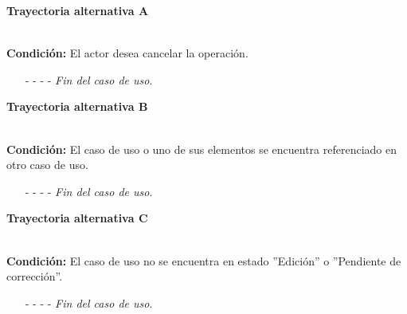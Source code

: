 \hypertarget{CU12-3:TAA}{\textbf{Trayectoria alternativa A}}\\
\noindent \textbf{Condición:} El actor desea cancelar la operación.
\begin{enumerate}
	\UCpaso[\UCactor] Oprime el botón  de la pantalla emergente.
	\UCpaso[\UCsist] Muestra la pantalla .
	\item[- -] - - {\em {Fin del caso de uso}}.%
\end{enumerate}
\hypertarget{CU12-3:TAB}{\textbf{Trayectoria alternativa B}}\\
\noindent \textbf{Condición:} El caso de uso o uno de sus elementos se encuentra referenciado en otro caso de uso.
\begin{enumerate}
	\UCpaso[\UCsist] Muestra el mensaje  en la pantalla .
	\item[- -] - - {\em {Fin del caso de uso}}.
\end{enumerate}
\hypertarget{CU12-3:TAC}{\textbf{Trayectoria alternativa C}}\\
\noindent \textbf{Condición:} El caso de uso no se encuentra en estado ''Edición'' o ''Pendiente de corrección''.
\begin{enumerate}
	\UCpaso[\UCsist] Oculta el botón \eliminar del caso que no se encuentra en estado de ''Edición'' o ''Pendiente de corrección''.
	\item[- -] - - {\em {Fin del caso de uso}}.
\end{enumerate}
